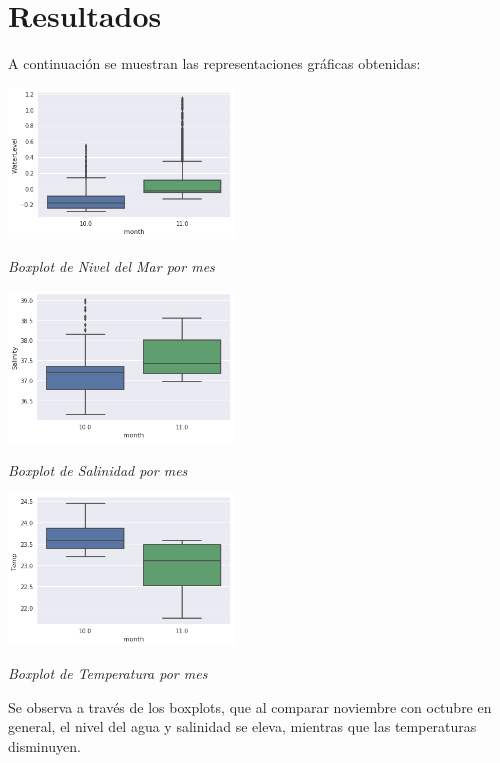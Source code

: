 \documentclass[a4paper]{article}
\begin{document}
\section{Resultados}

A continuación se muestran las representaciones gráficas obtenidas:

\begin{center}
	\includegraphics[height=4cm]{Boxplot1.png}
    
    \textit{Boxplot de Nivel del Mar por mes}
\end{center}

\begin{center}
	\includegraphics[height=4cm]{Boxplot2.png}
    
    \textit{Boxplot de Salinidad por mes}
\end{center}

\begin{center}
	\includegraphics[height=4cm]{Boxplot3.png}
    
    \textit{Boxplot de Temperatura por mes}
\end{center}

Se observa a través de los boxplots, que al comparar noviembre con octubre en general, el nivel del agua y salinidad se eleva, mientras que las temperaturas disminuyen.
\end{document}
